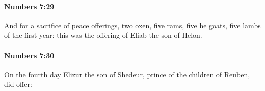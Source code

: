 		\paragraph{Numbers 7:29} %
			\label{NUMBERS-7-29}

			And for a sacrifice of peace offerings, two oxen, five rams, five he goats, five lambs of the first year: this was the offering of Eliab the son of Helon.


		\paragraph{Numbers 7:30} %
			\label{NUMBERS-7-30}

			On the fourth day Elizur the son of Shedeur, prince of the children of Reuben, did offer:


